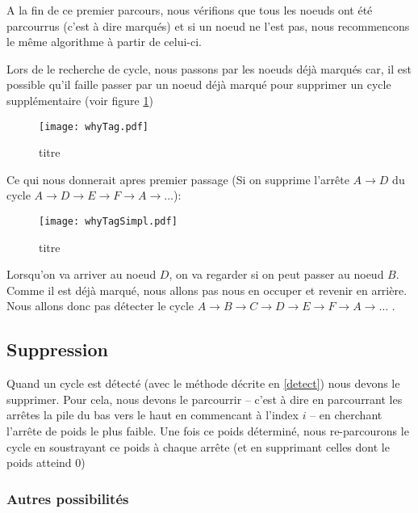 \documentclass[12pt, oneside]{article}
\begin{document}
A la fin de ce premier parcours, nous vérifions que tous les noeuds ont été parcourrus (c'est à dire marqués) et si un noeud ne l'est pas, nous recommencons le même algorithme à partir de celui-ci.

Lors de le recherche de cycle, nous passons par les noeuds déjà marqués car, il est possible qu'il faille passer par un noeud déjà marqué pour supprimer un cycle supplémentaire (voir figure \ref{whyTag})

\begin{figure}[h]
   \caption{\label{whyTag} titre}
   \begin{center}
   \texttt{[image: whyTag.pdf]}
   \end{center}
\end{figure}

Ce qui nous donnerait apres premier passage (Si on supprime l'arrête $A \rightarrow D$ du cycle $A \rightarrow D \rightarrow E \rightarrow F \rightarrow A \rightarrow\ldots$):
\begin{figure}[h]
   \caption{\label{whyTagSimpl} titre}
   \begin{center}
   \texttt{[image: whyTagSimpl.pdf]}
   \end{center}
\end{figure}
Lorsqu'on va arriver au noeud $D$, on va regarder si on peut passer au noeud $B$. Comme il est déjà marqué, nous allons pas nous en occuper et revenir en arrière. Nous allons donc pas détecter le cycle $A \rightarrow B \rightarrow C \rightarrow D \rightarrow E \rightarrow F \rightarrow A \rightarrow\ldots$  .

\subsection{Suppression}
\label{del}

Quand un cycle est détecté (avec le méthode décrite en \ref{detect}) nous devons le supprimer. Pour cela, nous devons le parcourrir -- c'est à dire en parcourrant les arrêtes la pile du bas vers le haut en commencant à l'index $i$ -- en cherchant l'arrête de poids le plus faible. Une fois ce poids déterminé, nous re-parcourons le cycle en soustrayant ce poids à chaque arrête (et en supprimant celles dont le poids atteind 0)



\subsubsection{Autres possibilités}
\label{others}
\end{document}
